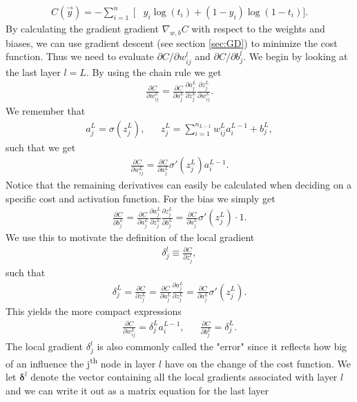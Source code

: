 \begin{align}\label{eq:cross_entropy}
   C(\vec{y}) =  -\sum_{i=1}^n \ \Big[ &y_i\log(t_i) + (1-y_i)\log ( 1 - t_i) \Big].
\end{align}
By calculating the gradient gradient $\nabla_{w,b}C$ with respect to the weights and biases, we can use gradient descent (see section \ref{sec:GD}) to minimize the cost function. Thus we need to evaluate $\partial C/\partial w_{ij}^l$ and $\partial C/\partial b_j^l$. We begin by looking at the last layer $l = L$. By using the chain rule we get
\begin{align*}
     \frac{\partial C}{\partial w_{ij}^L} = \frac{\partial C}{\partial a_j^L}\frac{\partial a_j^L}{\partial z_j^L} \frac{\partial z_j^L}{\partial w_{ij}^L}.
\end{align*}
We remember that 
\begin{align*}
    &a_j^L = \sigma(z_j^L),& &z_j^L = \sum_{i = 1}^{n_{L-1}} w_{ij}^L a_i^{L-1} + b_j^L,&
\end{align*}
such that we get 
\begin{align*}
     \frac{\partial C}{\partial w_{ij}^L} = \frac{\partial C}{\partial a_j^L} \sigma'( z_j^L) a_i^{L-1}.
\end{align*}
Notice that the remaining derivatives can easily be calculated when deciding on a specific  cost and activation function. For the bias we simply get 
\begin{align*}
     \frac{\partial C}{\partial b_j^L} = \frac{\partial C}{\partial a_j^L}\frac{\partial a_j^L}{\partial z_j^L} \frac{\partial z_j^L}{\partial b_j^L} = \frac{\partial C}{\partial a_j^L} \sigma'(z_j^L) \cdot 1.  
\end{align*}
We use this to motivate the definition of the local gradient
\begin{align*}
    \delta_j^l \equiv \frac{\partial C}{\partial z_j^l},
\end{align*}
such that 
\begin{align*}
    \delta_j^L = \frac{\partial C}{\partial z_j^L} =  \frac{\partial C}{\partial a_j^L}\frac{\partial a_j^L}{\partial z_j^L}  =  \frac{\partial C}{\partial a_j^L}\sigma'( z_j^L).
\end{align*}
This yields the more compact expressions
\begin{align*}
    &\frac{\partial C}{\partial w_{ij}^L} = \delta_j^L a_i^{L-1},& & \frac{\partial C}{\partial b_j^L} = \delta_j^L.&
\end{align*}
The local gradient $\delta_j^l$ is also commonly called the "error" since it reflects how big of an influence the j\textsuperscript{th} node in layer $l$ have on the change of the cost function. We let $\boldsymbol{\delta}^l$ denote the vector containing all the local gradients associated with layer $l$ and we can write it out as a matrix equation for the last layer
